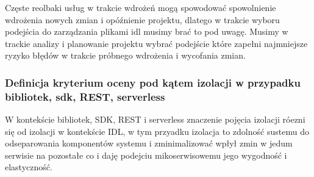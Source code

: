\documentclass[runningheads,12pt]{llncs}
\begin{document}
\begin{enumerate}
\begin{quote}
    \end{quote}
    Częste reolbaki usług w trakcie wdrożeń mogą spowodować spowolnienie wdrożenia nowych zmian i opóźnienie projektu, dlatego w trakcie wyboru podejścia do zarządzania plikami idl musimy brać to pod uwagę. Musimy w trackie analizy i planowanie projektu wybrać podejście które zapełni najmniejsze ryzyko błędów w trakcie próbnego wdrożenia i wycofania zmian.
\end{enumerate}
    
\subsubsection{Definicja kryterium oceny pod kątem izolacji w przypadku bibliotek, sdk, REST, serverless}

W kontekście bibliotek, SDK, REST i serverless znaczenie pojęcia izolacji róezni się od izolacji w kontekście IDL, w tym przyadku izolacja to zdolność sustemu do odseparowania komponentów systemu i zminimalizować wpłył zmin w jedum serwisie na pozostałe co i daję podejciu mikoserwisowemu jego wygodność i elastyczność.
\end{document}
